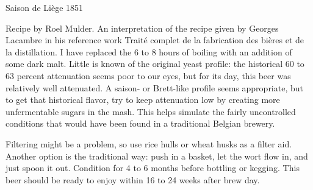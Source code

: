 \begin{recipie}{Saison de Liège 1851}

\begin{aboutblock}
Recipe by Roel Mulder. An interpretation of the recipe given by Georges Lacambre
in his reference work Traité complet de la fabrication des bières et de la
distillation. I have replaced the 6 to 8 hours of boiling with an addition of
some dark malt. Little is known of the original yeast profile: the historical 60
to 63 percent attenuation seems poor to our eyes, but for its day, this beer was
relatively well attenuated. A saison- or Brett-like profile seems appropriate,
but to get that historical flavor, try to keep attenuation low by creating more
unfermentable sugars in the mash. This helps simulate the fairly uncontrolled
conditions that would have been found in a traditional Belgian brewery.
\end{aboutblock}


\begin{methodandtiming}
 
\begin{mashsteps}
\end{mashsteps}

\begin{fermentationsteps}
\end{fermentationsteps}

\begin{directions}
Filtering might be a problem, so use rice hulls or wheat husks as a filter aid. Another
option is the traditional way: push in a basket, let the wort flow in, and just spoon
it out. Condition for 4 to 6 months before bottling or kegging. This beer should be ready
to enjoy within 16 to 24 weeks after brew day.
\end{directions}

\end{methodandtiming}

\pagebreak

\begin{ingredientsblock}

\begin{malts}
\end{malts}

\begin{hops}
\end{hops}


\end{ingredientsblock}

\end{recipie}

